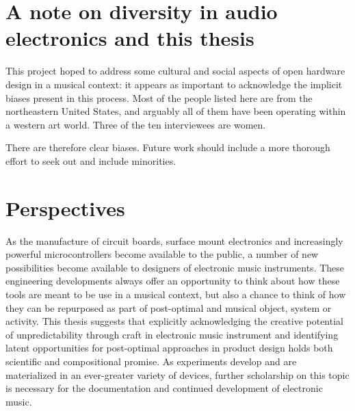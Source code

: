 \section{A note on diversity in audio electronics and this thesis}

This project hoped to address some cultural and social aspects of open hardware design in a musical context: it appears as important to acknowledge the implicit biases present in this process. Most of the people listed here are from the northeastern United States, and arguably all of them have been operating within a western art world. Three of the ten interviewees are women.

There are therefore clear biases. Future work should include a more thorough effort to seek out and include minorities. 

\section{Perspectives}

As the manufacture of circuit boards, surface mount electronics and increasingly powerful microcontrollers become available to the public, a number of new possibilities become available to designers of electronic music instruments. These engineering developments always offer an opportunity to think about how these tools are meant to be use in a musical context, but also a chance to think of how they can be repurposed as part of post-optimal and musical object, system or activity. This thesis suggests that explicitly acknowledging the creative potential of unpredictability through craft in electronic music instrument and identifying latent opportunities for post-optimal approaches in product design holds both scientific and compositional promise. As experiments develop and are materialized in an ever-greater variety of devices, further scholarship on this topic is necessary for the documentation and continued development of electronic music.   


